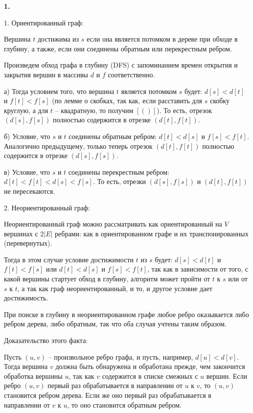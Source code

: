 \documentclass[12pt]{extreport}
\begin{document}
{\bf 1.} 

1. Ориентированный граф: 

Вершина $t$ достижима из $s$ если она является потомком в дереве при обходе в глубину, а также, если они соединены обратным или перекрестным ребром.

Произведем обход графа в глубину (DFS) с запоминанием времен открытия и закрытия вершин в массивы $d$ и $f$ соответственно. 

а) Тогда условием того, что вершина $t$ является потомком $s$ будет: $d[s] < d[t]$ и $f[t] < f[s]$ (по лемме о скобках, так как, если расставить для $s$ скобку круглую, а для $t$ -- квадратную, то получим $[()]$). То есть, отрезок $(d[s], f[s])$ полностью содержится в отрезке $(d[t], f[t])$.

б) Условие, что $s$ и $t$ соединены обратным ребром: $d[t] < d[s]$ и $ f[s] < f[t]$. Аналогично предыдущему, только теперь отрезок $(d[t], f[t])$ полностью содержится в отрезке $(d[s], f[s])$. 

в) Условие, что $s$ и $t$ соединены перекрестным ребром: $d[t] < f[t] < d[s] < f[s]$. То есть, отрезки $(d[s], f[s])$ и $(d[t], f[t])$ не пересекаются.

2. Неориентированный граф: 

Неориентированный граф можно рассматривать как ориентированный на $V$ вершинах с $2|E|$ ребрами: как в ориентированном графе и их транспонированных (перевернутых). 

Тогда в этом случае условие достижимости $t$ из $s$ будет: $d[s] < d[t]$ и $f[t] < f[s]$ или $d[t] < d[s]$ и $f[s] < f[t]$, так как в зависимости от того, с какой вершины стартует обход в глубину, алгоритм может пройти от $t$ к $s$ или от $s$ к $t$, а так как граф неориентированный, и то, и другое условие дает достижимость. 

При поиске в глубину в неориентированном графе любое ребро оказывается либо ребром дерева, либо обратным, так что оба случая учтены таким образом.

Доказательство этого факта: 

Пусть $(u, v)$ --  произвольное ребро графа, и пусть, например, $d[u] < d[v]$. Тогда вершина $v$ должна быть обнаружена и обработана прежде, чем закончится обработка вершины $u$, так как $v$ содержится в списке смежных с $u$ вершин. Если ребро $(u, v)$ первый раз обрабатывается в направлении от $u$ к $v$, то $(u, v)$ становится ребром дерева. Если же оно первый раз обрабатывается в направлении от $v$ к $u$, то оно становится обратным ребром.
\end{document}
